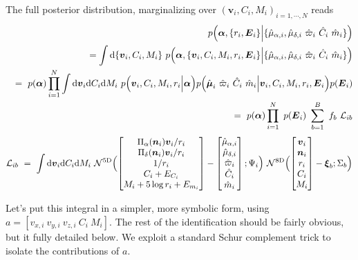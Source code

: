 \documentclass{article}
\renewcommand{\d}{{\mathrm{d}}}
\newcommand{\eqn}[1]{\begin{eqnarray}#1\end{eqnarray}}
\renewcommand{\vec}[1]{\boldsymbol{#1}}
\begin{document}
The full posterior distribution, marginalizing over $(\vec{v}_i, C_i, M_i)_{i=1, \cdots, N}$ reads
\eqn{
	&&p\Bigl(\vec{\alpha}, \{ r_i, \vec{E}_i \} \Bigl\vert \{\hat{\mu}_{\alpha, i}, \hat{\mu}_{\delta, i} \ \hat{\varpi}_i \ \hat{C}_i \ \hat{m}_i \} \Bigr) \\ 
	&&= \int\d\{ \vec{v}_i, C_i, M_i\} \ p\Bigl(\vec{\alpha}, \{\vec{v}_i, C_i, M_i, r_i, \vec{E}_i \} \Bigl\vert \{\hat{\mu}_{\alpha, i}, \hat{\mu}_{\delta, i} \ \hat{\varpi}_i \ \hat{C}_i \ \hat{m}_i \} \Bigr) \nonumber\\ 
	&&= \ p( \vec{\alpha} ) \prod_{i=1}^N \int\d \vec{v}_i \d C_i \d M_i \ p\Bigl(\vec{v}_i, C_i, M_i, r_i \Bigl\vert \vec{\alpha} \Bigr)p\Bigl( \hat{\vec{\mu}}_i \ \hat{\varpi}_i \ \hat{C}_i \ \hat{m}_i  \Bigl\vert \vec{v}_i, C_i, M_i, r_i, \vec{E}_i   \Bigr)   p(\vec{E}_i ) \nonumber\\
	&&=	\ p( \vec{\alpha} ) \prod_{i=1}^N \ p(\vec{E}_i ) \ \sum_{b=1}^B \ f_b \ \mathcal{L}_{ib} \nonumber
}
\eqn{
	 \mathcal{L}_{ib} \ = \  \int\d \vec{v}_i \d C_i \d M_i  \ \mathcal{N}^\mathrm{5D}\Bigl(
	 \begin{bmatrix} 
		\Pi_\alpha(\vec{n}_i) \vec{v}_i / r_i	\\ 
		\Pi_\delta(\vec{n}_i) \vec{v}_i / r_i	\\ 
		1/r_i	\\
		C_i+E_{C_i}	\\
		M_i + 5\log r_i +E_{m_i}
	\end{bmatrix} -
	 \begin{bmatrix} \hat{\mu}_{\alpha, i}\\ \hat{\mu}_{\delta, i} \\ \hat{\varpi}_i \\ \hat{C}_i \\ \hat{m}_i \end{bmatrix} ; \Psi_i \Bigr) 
	\ \mathcal{N}^\mathrm{8D}\Bigl(  \begin{bmatrix} \vec{v}_i \\ \vec{n}_i \\ r_i \\ C_i \\ M_i  \end{bmatrix} - \vec{\xi}_b; \Sigma_b\Bigr)  
	\nonumber
}

Let's put this integral in a simpler, more symbolic form, using $a = [v_{x,i} \ v_{y,i} \ v_{z,i} \ C_i \ M_i]$. The rest of the identification should be fairly obvious, but it fully detailed below.
We exploit a standard Schur complement trick to isolate the contributions of $a$. 
\end{document}
